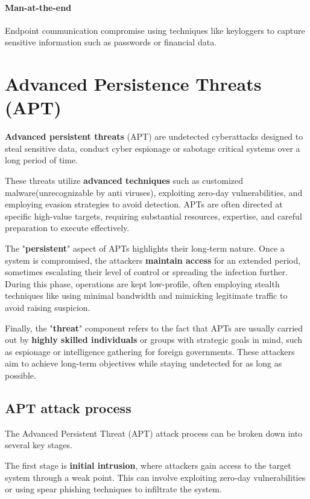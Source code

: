 \paragraph{Man-at-the-end}
Endpoint communication compromise using techniques like keyloggers to
capture sensitive information such as passwords or financial data.
\section{Advanced Persistence Threats (APT)}
\begin{boxH}
  \textbf{Advanced persistent threats} (APT) are undetected
  cyberattacks designed to steal sensitive data, conduct cyber
  espionage or sabotage critical systems over a long period of time.
\end{boxH}
These threats utilize \textbf{advanced techniques} such as customized
malware(unrecognizable by anti viruses), exploiting zero-day
vulnerabilities, and employing evasion strategies to avoid detection.
APTs are often directed at specific high-value targets, requiring
substantial resources, expertise, and careful preparation to execute
effectively.

The "\textbf{persistent}" aspect of APTs highlights their long-term
nature. Once a system is compromised, the attackers \textbf{maintain
access} for an extended period, sometimes escalating their level of
control or spreading the infection further. During this phase,
operations are kept low-profile, often employing stealth techniques
like using minimal bandwidth and mimicking legitimate traffic to avoid
raising suspicion.

Finally, the "\textbf{threat}" component refers to the fact that APTs
are usually carried out by \textbf{highly skilled individuals} or
groups with strategic goals in mind, such as espionage or intelligence
gathering for foreign governments. These attackers aim to achieve
long-term objectives while staying undetected for as long as possible.

\subsection{APT attack process}
The Advanced Persistent Threat (APT) attack process can be broken down
into several key stages. 

The first stage is \textbf{initial intrusion}, where attackers gain
access to the target system through a weak point. This can involve
exploiting zero-day vulnerabilities or using spear phishing techniques
to infiltrate the system.

